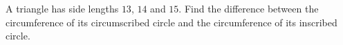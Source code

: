 A triangle has side lengths $13$, $14$ and $15$. Find the difference between the circumference of its circumscribed circle and the circumference of its inscribed circle.
